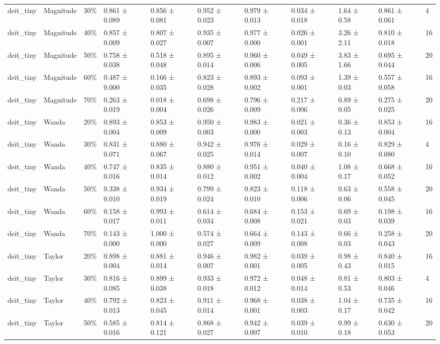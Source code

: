 \begin{table}[t]
\begin{tabular}{lllllllllll}
deit\_tiny & Magnitude & 30\% & 0.861 ± 0.089 & 0.856 ± 0.081 & 0.952 ± 0.023 & 0.979 ± 0.013 & 0.034 ± 0.018 & 1.64 ± 0.58 & 0.861 ± 0.061 & 4 \\
deit\_tiny & Magnitude & 40\% & 0.857 ± 0.009 & 0.807 ± 0.027 & 0.935 ± 0.007 & 0.977 ± 0.000 & 0.026 ± 0.001 & 3.26 ± 2.11 & 0.810 ± 0.018 & 16 \\
deit\_tiny & Magnitude & 50\% & 0.758 ± 0.038 & 0.518 ± 0.048 & 0.895 ± 0.014 & 0.960 ± 0.006 & 0.049 ± 0.005 & 3.83 ± 1.66 & 0.695 ± 0.044 & 20 \\
deit\_tiny & Magnitude & 60\% & 0.487 ± 0.000 & 0.166 ± 0.035 & 0.823 ± 0.028 & 0.893 ± 0.002 & 0.093 ± 0.001 & 1.39 ± 0.03 & 0.557 ± 0.058 & 16 \\
deit\_tiny & Magnitude & 70\% & 0.263 ± 0.019 & 0.018 ± 0.004 & 0.698 ± 0.026 & 0.796 ± 0.009 & 0.217 ± 0.006 & 0.89 ± 0.05 & 0.275 ± 0.025 & 20 \\
deit\_tiny & Wanda & 20\% & 0.893 ± 0.004 & 0.853 ± 0.009 & 0.950 ± 0.003 & 0.983 ± 0.000 & 0.021 ± 0.003 & 0.36 ± 0.13 & 0.853 ± 0.004 & 16 \\
deit\_tiny & Wanda & 30\% & 0.831 ± 0.071 & 0.880 ± 0.067 & 0.942 ± 0.025 & 0.976 ± 0.014 & 0.029 ± 0.007 & 0.16 ± 0.10 & 0.829 ± 0.080 & 4 \\
deit\_tiny & Wanda & 40\% & 0.747 ± 0.016 & 0.835 ± 0.014 & 0.880 ± 0.012 & 0.951 ± 0.002 & 0.040 ± 0.004 & 1.08 ± 0.17 & 0.668 ± 0.052 & 16 \\
deit\_tiny & Wanda & 50\% & 0.338 ± 0.010 & 0.934 ± 0.019 & 0.799 ± 0.024 & 0.823 ± 0.010 & 0.118 ± 0.006 & 0.63 ± 0.06 & 0.558 ± 0.045 & 20 \\
deit\_tiny & Wanda & 60\% & 0.158 ± 0.017 & 0.993 ± 0.011 & 0.614 ± 0.034 & 0.684 ± 0.008 & 0.153 ± 0.021 & 0.69 ± 0.03 & 0.198 ± 0.039 & 16 \\
deit\_tiny & Wanda & 70\% & 0.143 ± 0.000 & 1.000 ± 0.000 & 0.574 ± 0.027 & 0.664 ± 0.009 & 0.143 ± 0.008 & 0.66 ± 0.03 & 0.258 ± 0.043 & 20 \\
deit\_tiny & Taylor & 20\% & 0.898 ± 0.004 & 0.881 ± 0.014 & 0.946 ± 0.007 & 0.982 ± 0.001 & 0.039 ± 0.005 & 0.98 ± 0.43 & 0.840 ± 0.015 & 16 \\
deit\_tiny & Taylor & 30\% & 0.816 ± 0.085 & 0.899 ± 0.038 & 0.933 ± 0.018 & 0.972 ± 0.012 & 0.048 ± 0.014 & 0.81 ± 0.53 & 0.803 ± 0.046 & 4 \\
deit\_tiny & Taylor & 40\% & 0.792 ± 0.013 & 0.823 ± 0.045 & 0.911 ± 0.014 & 0.968 ± 0.001 & 0.038 ± 0.003 & 1.04 ± 0.17 & 0.735 ± 0.042 & 16 \\
deit\_tiny & Taylor & 50\% & 0.585 ± 0.016 & 0.814 ± 0.121 & 0.868 ± 0.027 & 0.942 ± 0.007 & 0.039 ± 0.010 & 0.99 ± 0.18 & 0.630 ± 0.053 & 20 \\

\end{tabular}
\end{table}
